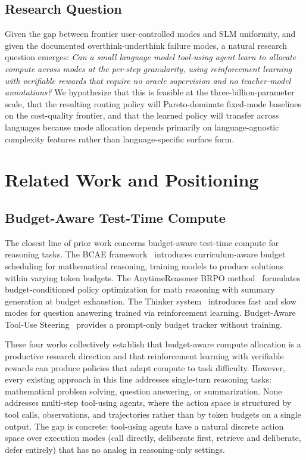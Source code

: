 \documentclass[11pt,a4paper]{article}
\begin{document}
\subsection{Research Question}

Given the gap between frontier user-controlled modes and SLM uniformity, and given the documented overthink-underthink failure modes, a natural research question emerges: \textit{Can a small language model tool-using agent learn to allocate compute across modes at the per-step granularity, using reinforcement learning with verifiable rewards that require no oracle supervision and no teacher-model annotations?} We hypothesize that this is feasible at the three-billion-parameter scale, that the resulting routing policy will Pareto-dominate fixed-mode baselines on the cost-quality frontier, and that the learned policy will transfer across languages because mode allocation depends primarily on language-agnostic complexity features rather than language-specific surface form.

\section{Related Work and Positioning}

\subsection{Budget-Aware Test-Time Compute}

The closest line of prior work concerns budget-aware test-time compute for reasoning tasks. The BCAE framework~\cite{bcae} introduces curriculum-aware budget scheduling for mathematical reasoning, training models to produce solutions within varying token budgets. The AnytimeReasoner BRPO method~\cite{anytime_reasoner} formulates budget-conditioned policy optimization for math reasoning with summary generation at budget exhaustion. The Thinker system~\cite{thinker} introduces fast and slow modes for question answering trained via reinforcement learning. Budget-Aware Tool-Use Steering~\cite{bats} provides a prompt-only budget tracker without training.

These four works collectively establish that budget-aware compute allocation is a productive research direction and that reinforcement learning with verifiable rewards can produce policies that adapt compute to task difficulty. However, every existing approach in this line addresses single-turn reasoning tasks: mathematical problem solving, question answering, or summarization. None addresses multi-step tool-using agents, where the action space is structured by tool calls, observations, and trajectories rather than by token budgets on a single output. The gap is concrete: tool-using agents have a natural discrete action space over execution modes (call directly, deliberate first, retrieve and deliberate, defer entirely) that has no analog in reasoning-only settings.
\end{document}

